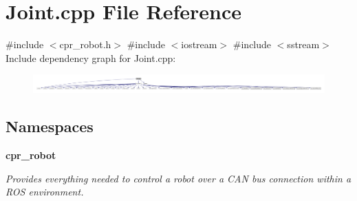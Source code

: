 \section{Joint.\+cpp File Reference}
\label{Joint_8cpp}
{\ttfamily \#include $<$cpr\+\_\+robot.\+h$>$}\newline
{\ttfamily \#include $<$iostream$>$}\newline
{\ttfamily \#include $<$sstream$>$}\newline
Include dependency graph for Joint.\+cpp\+:
\nopagebreak
\begin{figure}[H]
\begin{center}
\leavevmode
\includegraphics[width=350pt]{Joint_8cpp__incl}
\end{center}
\end{figure}
\subsection*{Namespaces}
\begin{DoxyCompactItemize}
\item 
 \textbf{ cpr\+\_\+robot}
\begin{DoxyCompactList}\small\item\em Provides everything needed to control a robot over a C\+AN bus connection within a R\+OS environment. \end{DoxyCompactList}\end{DoxyCompactItemize}
